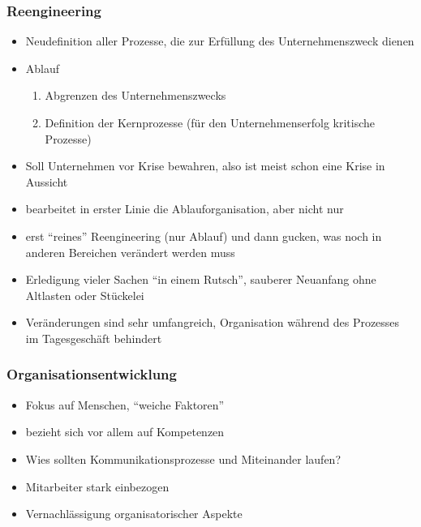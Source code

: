 \documentclass[a4paper, 12pt]{article}
\begin{document}
\subsubsection*{Reengineering}
\begin{itemize}
  \item Neudefinition aller Prozesse, die zur Erfüllung des Unternehmenszweck dienen
  \item Ablauf
    \begin{enumerate}
      \item Abgrenzen des Unternehmenszwecks
      \item Definition der Kernprozesse (für den Unternehmenserfolg kritische Prozesse)
    \end{enumerate}
  \item Soll Unternehmen vor Krise bewahren, also ist meist schon eine Krise in Aussicht
  \item bearbeitet in erster Linie die Ablauforganisation, aber nicht nur
  \item erst ``reines'' Reengineering (nur Ablauf) und dann gucken, was noch in anderen Bereichen verändert werden muss
\end{itemize}
\begin{itemize}
  \renewcommand{\labelitemi}{+}%
  \item Erledigung vieler Sachen ``in einem Rutsch'', sauberer Neuanfang ohne Altlasten oder Stückelei
\end{itemize}
\begin{itemize}
  \renewcommand{\labelitemi}{\(-\)}%
  \item Veränderungen sind sehr umfangreich, Organisation während des Prozesses im Tagesgeschäft behindert
\end{itemize}

\subsubsection*{Organisationsentwicklung}
\begin{itemize}
  \item Fokus auf Menschen, ``weiche Faktoren''
  \item bezieht sich vor allem auf Kompetenzen
  \item Wies sollten Kommunikationsprozesse und Miteinander laufen?
\end{itemize}
\begin{itemize}
  \renewcommand{\labelitemi}{+}%
  \item Mitarbeiter stark einbezogen
\end{itemize}
\begin{itemize}
  \renewcommand{\labelitemi}{\(-\)}%
  \item Vernachlässigung organisatorischer Aspekte
\end{itemize}
\end{document}
